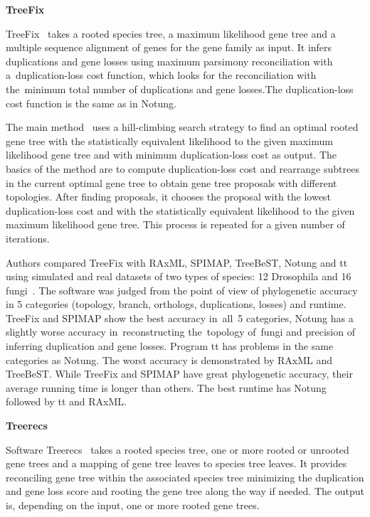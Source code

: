 \noindent \textbf{TreeFix}  

TreeFix~\cite{treefix_tutorial} takes a rooted species tree, a maximum likelihood gene tree and a multiple sequence alignment of genes for the gene family as input. It infers duplications and gene losses using maximum parsimony reconciliation with a~duplication-loss cost function, which looks for the reconciliation with the~minimum total number of duplications and gene losses.The duplication-loss cost function is the same as in Notung.

The main method~\cite{treefix} uses a hill-climbing search strategy to find an optimal rooted gene tree with the statistically equivalent likelihood to the given maximum likelihood gene tree and with minimum duplication-loss cost as output. The basics of the method are to compute duplication-loss cost and rearrange subtrees in the current optimal gene tree to obtain gene tree proposals with different topologies. After finding proposals, it chooses the proposal with the lowest duplication-loss cost and with the statistically equivalent likelihood to the given maximum likelihood gene tree. This process is repeated for a given number of iterations.

Authors compared TreeFix with RAxML, SPIMAP, TreeBeST, Notung and tt using simulated and real datasets of two types of species: 12 Drosophila and 16 fungi~\cite{treefix_online}. The software was judged from the point of view of phylogenetic accuracy in 5 categories (topology, branch, orthologs, duplications, losses) and runtime. TreeFix and SPIMAP show the best accuracy in~all~5 categories, Notung has a slightly worse accuracy in~reconstructing the~topology of~fungi and precision of inferring duplication and gene losses. Program tt has problems in the same categories as Notung. The worst accuracy is demonstrated by RAxML and TreeBeST. While TreeFix and SPIMAP have great phylogenetic accuracy, their average running time is longer than others. The best runtime has Notung followed by tt and RAxML.

\noindent\textbf{Treerecs} 

Software Treerecs~\cite{treerecs_tutorial} takes a rooted species tree, one or more rooted or unrooted gene trees and a mapping of gene tree leaves to species tree leaves. It provides reconciling gene tree within the associated species tree minimizing the duplication and gene loss score and rooting the gene tree along the way if needed. The output is, depending on the input, one or more rooted gene trees.

